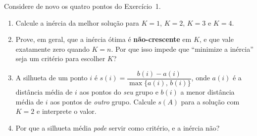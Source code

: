 \documentclass[11pt,a4paper]{article}
\begin{document}
\begin{exercicio}
Considere de novo os quatro pontos do Exercício~1.
\begin{enumerate}[label=(\alph*),leftmargin=1.1cm]
  \item Calcule a inércia da melhor solução para $K=1$, $K=2$, $K=3$ e $K=4$.
  \item Prove, em geral, que a inércia ótima é \textbf{não-crescente} em $K$, e
        que vale exatamente zero quando $K=n$. Por que isso impede que
        ``minimize a inércia'' seja um critério para escolher $K$?
  \item A silhueta de um ponto $i$ é
        $s(i) = \dfrac{b(i)-a(i)}{\max\{a(i),\,b(i)\}}$, onde $a(i)$ é a
        distância média de $i$ aos pontos do \emph{seu} grupo e $b(i)$ a menor
        distância média de $i$ aos pontos de \emph{outro} grupo. Calcule $s(A)$
        para a solução com $K=2$ e interprete o valor.
  \item Por que a silhueta média \emph{pode} servir como critério, e a inércia
        não?
\end{enumerate}
\end{exercicio}
\end{document}

